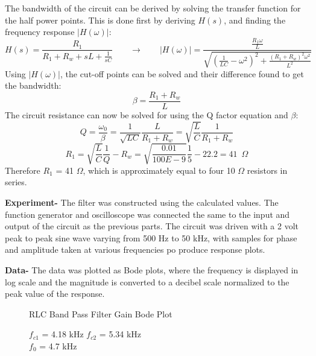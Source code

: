 \documentclass[12pt]{article}
\begin{document}
The bandwidth of the circuit can be derived by solving the transfer function for the half power points. This is done first by deriving $H(s)$, and finding the frequency response $|H(\omega)|$:
\begin{equation}
H(s) =\frac{R_1}{R_1+R_w+sL+\frac{1}{sC}} \hspace{24pt}\rightarrow\hspace{24pt}|H(\omega)|= \frac{\frac{R_1\omega}{L}}{\sqrt{(\frac{1}{LC}-\omega^2)^2 + \frac{(R_1+R_w)^2\omega^2}{L^2}}}
\end{equation}
Using $|H(\omega)|$, the cut-off points can be solved and their difference found to get the bandwidth:
\begin{equation}
\beta = \frac{R_1 + R_w}{L}
\end{equation}
The circuit resistance can now be solved for using the Q factor equation and $\beta$:
\begin{equation}
Q = \frac{\omega_0}{\beta}=\frac{1}{\sqrt{LC}}\frac{L}{R_1+R_w}= \sqrt{\frac{L}{C}}\frac{1}{R_1+R_w}
\end{equation}
\begin{equation}
R_1 = \sqrt{\frac{L}{C}}\frac{1}{Q}-R_w = \sqrt{\frac{0.01}{100E-9}}\frac{1}{5}-22.2= 41\hspace{6pt}\Omega 
\end{equation}
Therefore $R_1$ = 41 $\Omega$, which is approximately equal to four 10 $\Omega$ resistors in series.\\\par 
\textbf{Experiment-} The filter was constructed using the calculated values. The function generator and oscilloscope was connected the same to the input and output of the circuit as the previous parts. The circuit was driven with a 2 volt peak to peak sine wave varying from 500 Hz to 50 kHz, with samples for phase and amplitude taken at various frequencies po produce response plots.\\\par 
\textbf{Data-} The data was plotted as Bode plots, where the frequency is displayed in log scale and the magnitude is converted to a decibel scale normalized to the peak value of the response.
\FloatBarrier
\begin{figure}[h!]
\begin{center}
    	\resizebox{0.6\textwidth}{!}{}
\end{center}
\caption{RLC Band Pass Filter Gain Bode Plot}
\caption*{$f_{c1}$ = 4.18 kHz $f_{c2}$ = 5.34 kHz \\ $f_0$ = 4.7 kHz}
\end{figure}
\end{document}
